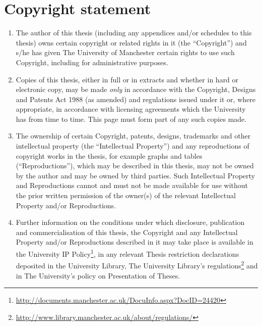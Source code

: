 
\cleardoublepage

{}

\chapter*{Copyright statement}

\vspace*{-0.3cm}

\begin{enumerate}[label=\roman*]

    \item The author of this thesis (including any appendices and/or schedules to this thesis) owns certain copyright or related rights in it (the ``Copyright'') and s/he has given The University of Manchester certain rights to use such Copyright, including for administrative purposes.

    \item Copies of this thesis, either in full or in extracts and whether in hard or electronic copy, may be made \emph{only} in accordance with the Copyright, Designs and Patents Act 1988 (as amended) and regulations issued under it or, where appropriate, in accordance with licensing agreements which the University has from time to time. This page must form part of any such copies made.

    \item The ownership of certain Copyright, patents, designs, trademarks and other intellectual property (the ``Intellectual Property'') and any reproductions of copyright works in the thesis, for example graphs and tables (``Reproductions''), which may be described in this thesis, may not be owned by the author and may be owned by third parties. Such Intellectual Property and Reproductions cannot and must not be made available for use without the prior written permission of the owner(s) of the relevant Intellectual Property and/or Reproductions.

    \item Further information on the conditions under which disclosure, publication and commercialisation of this thesis, the Copyright and any Intellectual Property and/or Reproductions described in it may take place is available in the University IP Policy\footnote{\url{http://documents.manchester.ac.uk/DocuInfo.aspx?DocID=24420}}, in any relevant Thesis restriction declarations deposited in the University Library, The University Library’s regulations\footnote{\url{http://www.library.manchester.ac.uk/about/regulations/}} and in The University’s policy on Presentation of Theses.

\end{enumerate}
